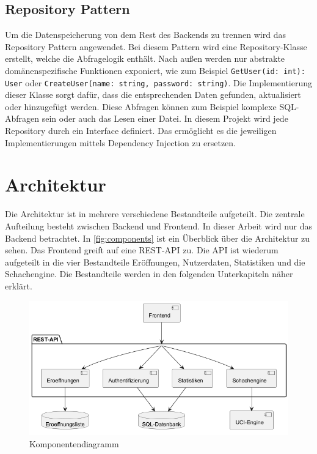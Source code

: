 \subsection{Repository Pattern}
Um die Datenspeicherung von dem Rest des Backends zu trennen wird das Repository Pattern angewendet. Bei diesem Pattern wird eine Repository-Klasse erstellt, welche die Abfragelogik enthält. Nach außen werden nur abstrakte domänenspezifische Funktionen exponiert, wie zum Beispiel \lstinline{GetUser(id: int): User} oder \lstinline{CreateUser(name: string, password: string)}. Die Implementierung dieser Klasse sorgt dafür, dass die entsprechenden Daten gefunden, aktualisiert oder hinzugefügt werden. Diese Abfragen können zum Beispiel komplexe SQL-Abfragen sein oder auch das Lesen einer Datei. In diesem Projekt wird jede Repository durch ein Interface definiert. Das ermöglicht es die jeweiligen Implementierungen mittels Dependency Injection zu ersetzen. \cite{evans_domain-driven_2004}

\section{Architektur}
Die Architektur ist in mehrere verschiedene Bestandteile aufgeteilt. Die zentrale Aufteilung besteht zwischen Backend und Frontend. In dieser Arbeit wird nur das Backend betrachtet. In \autoref{fig:components} ist ein Überblick über die Architektur zu sehen. Das Frontend greift auf eine \ac{REST}-API zu.
Die API ist wiederum aufgeteilt in die vier Bestandteile Eröffnungen, Nutzerdaten, Statistiken und die Schachengine.
Die Bestandteile werden in den folgenden Unterkapiteln näher erklärt.

\begin{figure}[h]
    \includegraphics[width=\linewidth]{images/diagrams/components.png}
    \caption{Komponentendiagramm}
    \label{fig:components}
\end{figure}

